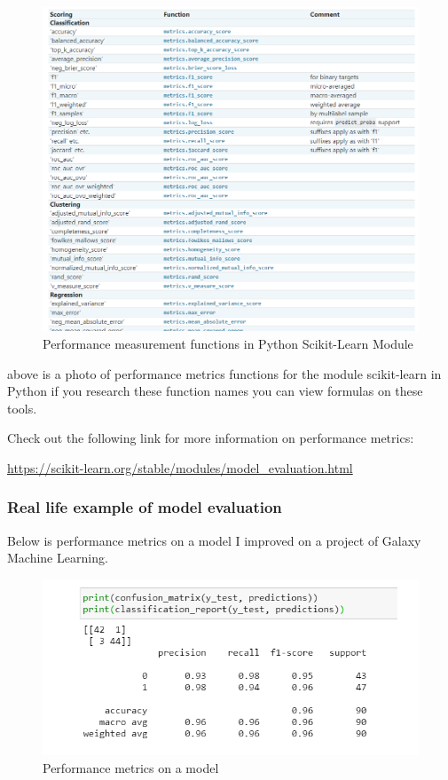     \begin{figure}[H]
        \includegraphics[width=\linewidth]{images/performance.png}
        \caption{Performance measurement functions in Python Scikit-Learn Module}
        \label{fig:perf}
    \end{figure}

above is a photo of performance metrics functions for the module scikit-learn in Python if you research these function names you can view formulas on these tools.

Check out the following link for more information on performance metrics:

\url{https://scikit-learn.org/stable/modules/model_evaluation.html}

\subsubsection{Real life example of model evaluation}

Below is performance metrics on a model I improved on a project of Galaxy Machine Learning.

\begin{figure}[H]
    \includegraphics[width=\linewidth]{images/performancemetrics.png}
    \caption{Performance metrics on a model}
    \label{fig:perfex}
\end{figure}

